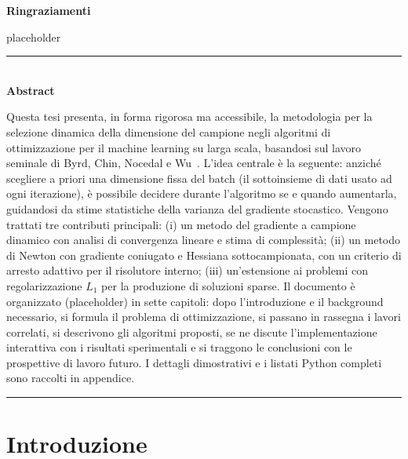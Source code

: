 \documentclass[a4paper,12pt]{article}
\numberwithin{equation}{section}
\numberwithin{figure}{section}
\numberwithin{table}{section}
\begin{document}
\newpage
\vspace*{3.5cm}
\begin{center}
  {\large\bfseries\color{coverblue} Ringraziamenti}\\[0.6cm]
\end{center}
\noindent
placeholder
\newpage
\begin{center}
  \rule{0.8\textwidth}{0.4pt}\\[0.4cm]
  {\large\bfseries\color{coverblue} Abstract}\\[0.3cm]
\end{center}
\noindent
Questa tesi presenta, in forma rigorosa ma accessibile, la metodologia per la
selezione dinamica della dimensione del campione negli algoritmi di
ottimizzazione per il machine learning su larga scala, basandosi sul lavoro
seminale di Byrd, Chin, Nocedal e Wu~\cite{byrd2012}. L'idea centrale è la
seguente: anziché scegliere a priori una dimensione fissa del batch (il
sottoinsieme di dati usato ad ogni iterazione), è possibile decidere
durante l'algoritmo se e quando aumentarla, guidandosi da stime
statistiche della varianza del gradiente stocastico. Vengono trattati tre
contributi principali: (i) un metodo del gradiente a campione dinamico con
analisi di convergenza lineare e stima di complessità; (ii) un metodo di
Newton con gradiente coniugato e Hessiana sottocampionata, con un criterio di
arresto adattivo per il risolutore interno; (iii) un'estensione ai problemi
con regolarizzazione $L_1$ per la produzione di soluzioni sparse. Il documento
è organizzato (placeholder) in sette capitoli: dopo l'introduzione e il background
necessario, si formula il problema di ottimizzazione, si passano in rassegna i
lavori correlati, si descrivono gli algoritmi proposti, se ne discute
l'implementazione interattiva con i risultati sperimentali e si traggono le
conclusioni con le prospettive di lavoro futuro. I dettagli dimostrativi e i
listati Python completi sono raccolti in appendice.
\begin{center}
  \rule{0.8\textwidth}{0.4pt}
\end{center}
\newpage
\tableofcontents
\clearpage

\section{Introduzione}\label{sec:introduzione}
\end{document}
